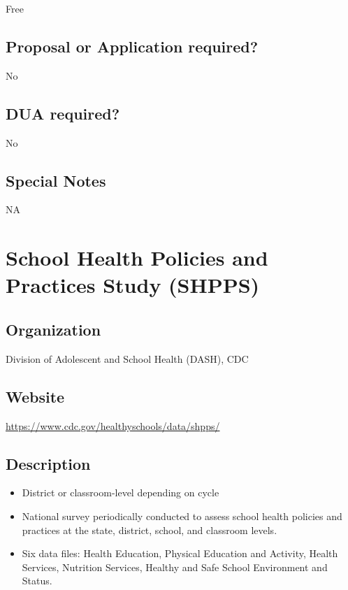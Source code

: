 \documentclass[
]{book}
\providecommand{\tightlist}{%
  \setlength{\itemsep}{0pt}\setlength{\parskip}{0pt}}
\begin{document}
Free

\hypertarget{proposal-or-application-required-74}{%
\section{Proposal or Application required?}\label{proposal-or-application-required-74}}

No

\hypertarget{dua-required-74}{%
\section{DUA required?}\label{dua-required-74}}

No

\hypertarget{special-notes-74}{%
\section{Special Notes}\label{special-notes-74}}

NA

\mainmatter

\hypertarget{school-health-policies-and-practices-study-shpps}{%
\chapter{School Health Policies and Practices Study (SHPPS)}\label{school-health-policies-and-practices-study-shpps}}

\hypertarget{organization-75}{%
\section{Organization}\label{organization-75}}

Division of Adolescent and School Health (DASH), CDC

\hypertarget{website-75}{%
\section{Website}\label{website-75}}

\url{https://www.cdc.gov/healthyschools/data/shpps/}

\hypertarget{description-75}{%
\section{Description}\label{description-75}}

\begin{itemize}
\tightlist
\item
  District or classroom-level depending on cycle
\item
  National survey periodically conducted to assess school health policies and practices at the state, district, school, and classroom levels.
\item
  Six data files: Health Education, Physical Education and Activity, Health Services, Nutrition Services, Healthy and Safe School Environment and Status.
\end{itemize}
\end{document}

